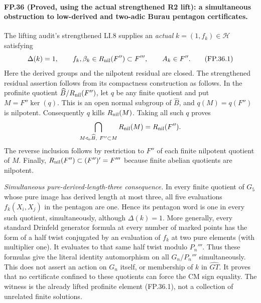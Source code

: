 \paragraph{FP.36 (Proved, using the actual strengthened R2 lift): a simultaneous obstruction to low-derived and two-adic Burau pentagon certificates.}
The lifting audit's strengthened LI.8 supplies an \emph{actual}
$k=(1,f_k)\in\mathcal H$ satisfying
\[
 \Delta(k)=1,\qquad
 f_k,\beta_k\in R_{\rm nil}(F'')\subset F''',\qquad A_k\in F''.
 \tag{FP.36.1}
\]
Here the derived groups and the nilpotent residual are closed.
The strengthened residual assertion follows from its compactness
construction as follows. In the profinite quotient
$\widehat B/R_{\rm nil}(F'')$, let $q$ be any finite quotient
and put $M=F''\ker(q)$. This is an open normal subgroup of
$\widehat B$, and $q(M)=q(F'')$ is nilpotent. Consequently
$q$ kills $R_{\rm nil}(M)$. Taking all such $q$ proves
\[
 \bigcap_{M\mathrel{\triangleleft_o}\widehat B,\ F''\subset M}
             R_{\rm nil}(M)=R_{\rm nil}(F'').
\]
The reverse inclusion follows by restriction to $F''$ of each
finite nilpotent quotient of $M$. Finally,
$R_{\rm nil}(F'')\subset(F'')'=F'''$ because finite abelian
quotients are nilpotent.

\emph{Simultaneous pure-derived-length-three consequence.}
In every finite quotient of $G_5$ whose pure image has derived
length at most three, all five evaluations
$f_k(X_i,X_j)$ in the pentagon are one. Hence its pentagon
word is one in every such quotient, simultaneously, although
$\Delta(k)=1$. More generally, every standard Drinfeld
generator formula at every number of marked points has the form
of a half twist conjugated by an evaluation of $f_k$ at two pure
elements (with multiplier one). It evaluates to that same half
twist modulo $P_n'''$. Thus these formulas give the literal
identity automorphism on all $G_n/P_n'''$ simultaneously.
This does not assert an action on $G_n$ itself, or membership of
$k$ in $\widehat{GT}$. It proves that no certificate confined to
these quotients can force the CM sign equality. The witness is
the already lifted profinite element (FP.36.1), not a collection
of unrelated finite solutions.

